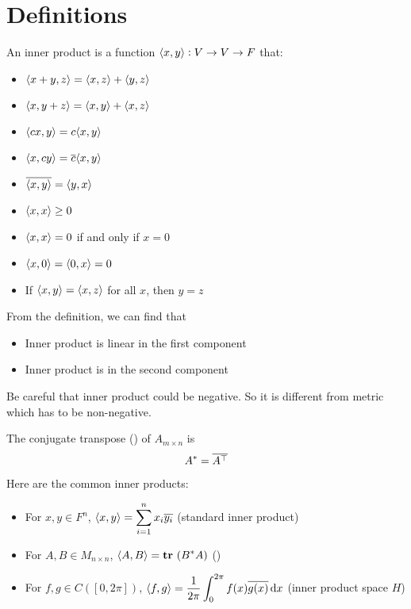 \section{Definitions}

\begin{definition}
    An inner product is a function $\innerproduct{x}{y}: V \rightarrow V \rightarrow F$ that:
\begin{itemize}
    \item $\innerproduct{x + y}{z} = \innerproduct{x}{z} + \innerproduct{y}{z}$    
    \item $\innerproduct{x}{y+z} = \innerproduct{x}{y} + \innerproduct{x}{z}$
    \item $\innerproduct{cx}{y} = c \innerproduct{x}{y}$
    \item $\innerproduct{x}{cy} = \conjugate{c} \innerproduct{x}{y}$
    \item $\conjugate{\innerproduct{x}{y}} = \innerproduct{y}{x}$
    \item $\innerproduct{x}{x} \geq 0$
    \item $\innerproduct{x}{x} = 0$ if and only if $x = 0$
    \item $\innerproduct{x}{0} = \innerproduct{0}{x} = 0$
    \item If $\innerproduct{x}{y} = \innerproduct{x}{z}$ for all $x$, then $y = z$
\end{itemize}
\end{definition}

From the definition, we can find that
\begin{itemize}
    \item Inner product is linear in the first component
    \item Inner product is  in the second component
\end{itemize}

Be careful that inner product could be negative. So it is different from metric which has to be non-negative.


\begin{definition}
    The conjugate transpose () of $A_{m \times n}$ is 
    \begin{equation}
        A^* = \overline{{A}^\top}
    \end{equation}
\end{definition}

\begin{example}
    Here are the common inner products:
\begin{itemize}
    \item For $x,y \in F^n$, $\displaystyle \innerproduct{x}{y} = \sum_{i=1}^n x_i \conjugate{y_i}$ (standard inner product)
    \item For $A,B \in M_{n \times n}$, $\innerproduct{A}{B} = \trace{B^* A}$ ()
    \item For $f,g \in C([0,2 \pi])$, $\displaystyle \innerproduct{f}{g} = \frac{1}{2 \pi} \int_{0}^{2\pi} f(x) \conjugate{g(x)} \dif x$ (inner product space $H$)
\end{itemize}
\end{example}


